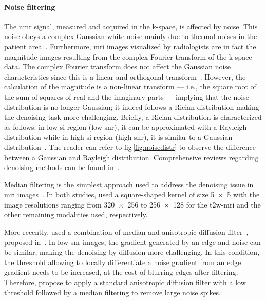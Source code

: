 \paragraph{Noise filtering} The \ac{nmr} signal, measured and acquired in the k-space, is affected by noise.
This noise obeys a complex Gaussian white noise mainly due to thermal noises in the patient area~\cite{Nowak1999}.
Furthermore, \ac{mri} images visualized by radiologists are in fact the magnitude images resulting from the complex Fourier transform of the k-space data.
The complex Fourier transform does not affect the Gaussian noise characteristics since this is a linear and orthogonal transform~\cite{Nowak1999}.
However, the calculation of the magnitude is a non-linear transform --- i.e., the square root of the sum of squares of real and the imaginary parts --- implying that the noise distribution is no longer Gaussian; it indeed follows a Rician distribution making the denoising task more challenging.
Briefly, a Rician distribution is characterized as follows: in low-\ac{si} region (low-\ac{snr}), it can be approximated with a Rayleigh distribution while in high-\ac{si} region (high-\ac{snr}), it is similar to a Gaussian distribution~\cite{Manjon2008}.
The reader can refer to \acs{fig}\,\ref{fig:noisedistr} to observe the difference between a Gaussian and Rayleigh distribution.
Comprehensive reviews regarding denoising methods can be found in~\cite{Buades2005,Mohan2014}.

Median filtering is the simplest approach used to address the denoising issue in \ac{mri} images~\cite{Ozer2009,Ozer2010}.
In both studies, \citeauthor{Ozer2010} used a square-shaped kernel of size \SI[product-units=repeat]{5x5}{\px} with the image resolutions ranging from \SI[product-units=repeat]{320x256}{\px} to \SI[product-units=repeat]{256x128}{\px} for the \ac{t2w}-\ac{mri} and the other remaining modalities used, respectively.

More recently, \citeauthor{rampun2016quantitative} used a combination of median and anisotropic diffusion filter~\cite{rampun2015classifying,rampun2016computer,rampun2016computerb,rampun2016quantitative}, proposed in~\cite{ling2002smoothing}.
In low-\ac{snr} images, the gradient generated by an edge and noise can be similar, making the denoising by diffusion more challenging.
In this condition, the threshold allowing to locally differentiate a noise gradient from an edge gradient needs to be increased, at the cost of blurring edges after filtering.
Therefore, \citeauthor{ling2002smoothing} propose to apply a standard anisotropic diffusion filter with a low threshold followed by a median filtering to remove large noise spikes.

